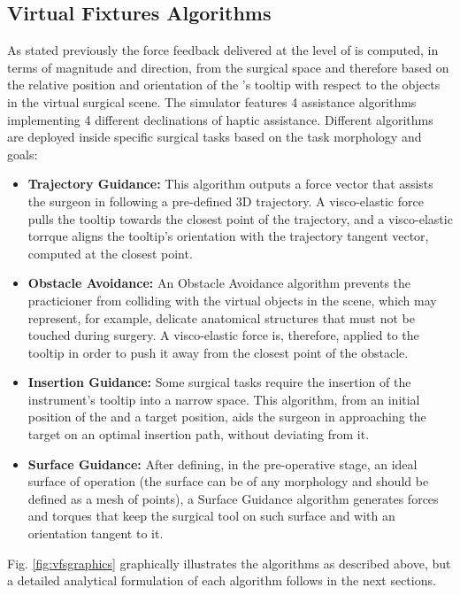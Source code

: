 \documentclass[../main.tex]{subfiles}
\begin{document}
\subsection{Virtual Fixtures Algorithms}
As stated previously the force feedback delivered at the level of \mtm is computed, in terms of magnitude and direction, from the surgical space and therefore based on the relative position and orientation of the \psm's tooltip with respect to the objects in the virtual surgical scene. The simulator features 4 assistance algorithms implementing 4 different declinations of haptic assistance. Different algorithms are deployed inside specific surgical tasks based on the task morphology and goals:
\begin{itemize}
  \item \textbf{Trajectory Guidance:} This algorithm outputs a force vector that assists the surgeon in following a pre-defined 3D trajectory. A visco-elastic force pulls the \ee tooltip towards the closest point of the trajectory, and a visco-elastic torrque aligns the tooltip's orientation with the trajectory tangent vector, computed at the closest point.
  \item \textbf{Obstacle Avoidance:} An Obstacle Avoidance algorithm prevents the practicioner from colliding with the virtual objects in the scene, which may represent, for example, delicate anatomical structures that must not be touched during surgery. A visco-elastic force is, therefore, applied to the \ee tooltip in order to push it away from the closest point of the obstacle.
  \item \textbf{Insertion Guidance:} Some surgical tasks require the insertion of the instrument's tooltip into a narrow space. This algorithm, from an initial position of the \psm and a target position, aids the surgeon in approaching the target on an optimal insertion path, without deviating from it.
  \item \textbf{Surface Guidance:} After defining, in the pre-operative stage, an ideal surface of operation (the surface can be of any morphology and should be defined as a mesh of points), a Surface Guidance algorithm generates forces and torques that keep the surgical tool on such surface and with an orientation tangent to it. 
\end{itemize} 

Fig. \ref{fig:vfsgraphics} graphically illustrates the \vf algorithms as described above, but a detailed analytical formulation of each algorithm follows in the next sections.
\end{document}
